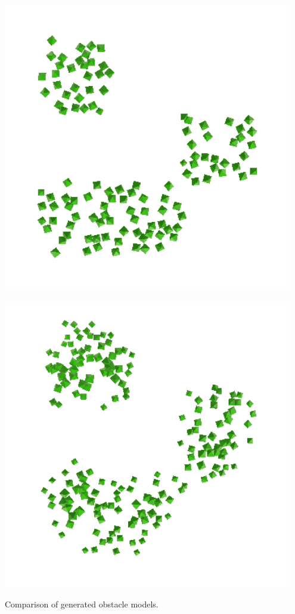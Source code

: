 \begin{center}
    \captionsetup{type=figure}
    \begin{minipage}{.5\textwidth}
        \centering
        \includegraphics[width=0.95\textwidth]{img/inorganic minerals.png}
        \label{fig:analysis-obstacles-unnatural-boundary}
    \end{minipage}%
    \begin{minipage}{.5\textwidth}
        \centering
        \includegraphics[width=0.95\textwidth]{img/organic minerals.png}
        \label{fig:analysis-obstacles-natural-boundary}
    \end{minipage}
    \caption{Comparison of generated obstacle models.}
\end{center}

